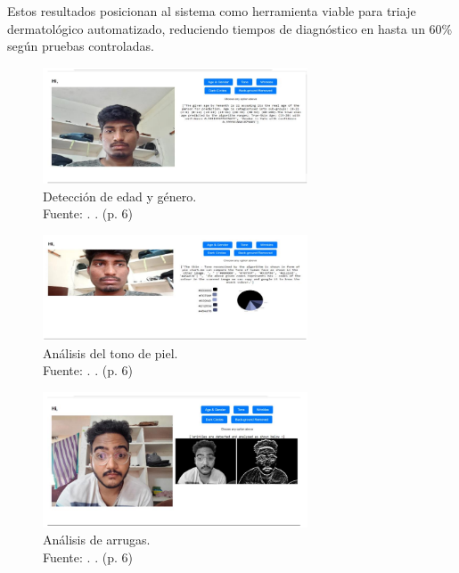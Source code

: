 Estos resultados posicionan al sistema como herramienta viable para triaje dermatológico automatizado, reduciendo tiempos de diagnóstico en hasta un 60\% según pruebas controladas.


\begin{figure}[H]
	\begin{center}
		\includegraphics[width=0.7\textwidth]{2/figures/softres1.png}
		\caption[Detección de edad y género]{Detección de edad y género.\\
			Fuente: \cite{Tamilkodi2024}. . (p. 6)}
		\label{2:fig8}
	\end{center}
\end{figure}

\begin{figure}[H]
	\begin{center}
		\includegraphics[width=0.7\textwidth]{2/figures/softres2.png}
		\caption[Análisis del tono de piel]{Análisis del tono de piel.\\
			Fuente: \cite{Tamilkodi2024}. . (p. 6)}
		\label{2:fig9}
	\end{center}
\end{figure}

\begin{figure}[H]
	\begin{center}
		\includegraphics[width=0.7\textwidth]{2/figures/softres3.png}
		\caption[Análisis de arrugas]{Análisis de arrugas.\\
			Fuente: \cite{Tamilkodi2024}. . (p. 6)}
		\label{2:fig10}
	\end{center}
\end{figure}

